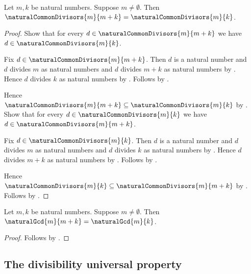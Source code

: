 \begin{theorem}\label{common_divisors_subtract_sum}
    Let $m,k$ be natural numbers.
    Suppose $m\neq\emptyset$.
    Then $\naturalCommonDivisors{m}{m+k}
        =\naturalCommonDivisors{m}{k}$.
\end{theorem}
\begin{proof}
    Show that for every
        $d\in\naturalCommonDivisors{m}{m+k}$ we have
        $d\in\naturalCommonDivisors{m}{k}$.
    \begin{subproof}
        Fix $d\in\naturalCommonDivisors{m}{m+k}$.
        Then $d$ is a natural number and
            $d$ divides $m$ as natural numbers and
            $d$ divides $m+k$ as natural numbers
            by .
        Hence $d$ divides $k$ as natural numbers
            by .
        Follows by
            .
    \end{subproof}
    Hence $\naturalCommonDivisors{m}{m+k}
        \subseteq\naturalCommonDivisors{m}{k}$
        by .
    Show that for every
        $d\in\naturalCommonDivisors{m}{k}$ we have
        $d\in\naturalCommonDivisors{m}{m+k}$.
    \begin{subproof}
        Fix $d\in\naturalCommonDivisors{m}{k}$.
        Then $d$ is a natural number and
            $d$ divides $m$ as natural numbers and
            $d$ divides $k$ as natural numbers
            by .
        Hence $d$ divides $m+k$ as natural numbers
            by .
        Follows by
            .
    \end{subproof}
    Hence $\naturalCommonDivisors{m}{k}
        \subseteq\naturalCommonDivisors{m}{m+k}$
        by .
    Follows by .
\end{proof}

\begin{corollary}\label{natural_gcd_subtract_sum}
    Let $m,k$ be natural numbers.
    Suppose $m\neq\emptyset$.
    Then $\naturalGcd{m}{m+k}=\naturalGcd{m}{k}$.
\end{corollary}
\begin{proof}
    Follows by
        .
\end{proof}

\subsection{The divisibility universal property}

